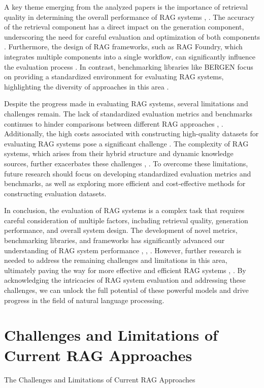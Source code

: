 \documentclass[conference]{IEEEtran}
\begin{document}
A key theme emerging from the analyzed papers is the importance of retrieval quality in determining the overall performance of RAG systems \cite{b4}, \cite{b5}. The accuracy of the retrieval component has a direct impact on the generation component, underscoring the need for careful evaluation and optimization of both components \cite{b2}. Furthermore, the design of RAG frameworks, such as RAG Foundry, which integrates multiple components into a single workflow, can significantly influence the evaluation process \cite{b5}. In contrast, benchmarking libraries like BERGEN focus on providing a standardized environment for evaluating RAG systems, highlighting the diversity of approaches in this area \cite{b4}.

Despite the progress made in evaluating RAG systems, several limitations and challenges remain. The lack of standardized evaluation metrics and benchmarks continues to hinder comparisons between different RAG approaches \cite{b2}, \cite{b3}. Additionally, the high costs associated with constructing high-quality datasets for evaluating RAG systems pose a significant challenge \cite{b7}. The complexity of RAG systems, which arises from their hybrid structure and dynamic knowledge sources, further exacerbates these challenges \cite{b2}, \cite{b5}. To overcome these limitations, future research should focus on developing standardized evaluation metrics and benchmarks, as well as exploring more efficient and cost-effective methods for constructing evaluation datasets.

In conclusion, the evaluation of RAG systems is a complex task that requires careful consideration of multiple factors, including retrieval quality, generation performance, and overall system design. The development of novel metrics, benchmarking libraries, and frameworks has significantly advanced our understanding of RAG system performance \cite{b4}, \cite{b5}, \cite{b7}. However, further research is needed to address the remaining challenges and limitations in this area, ultimately paving the way for more effective and efficient RAG systems \cite{b2}, \cite{b3}. By acknowledging the intricacies of RAG system evaluation and addressing these challenges, we can unlock the full potential of these powerful models and drive progress in the field of natural language processing.

\section{Challenges and Limitations of Current RAG Approaches}
The Challenges and Limitations of Current RAG Approaches
\end{document}
